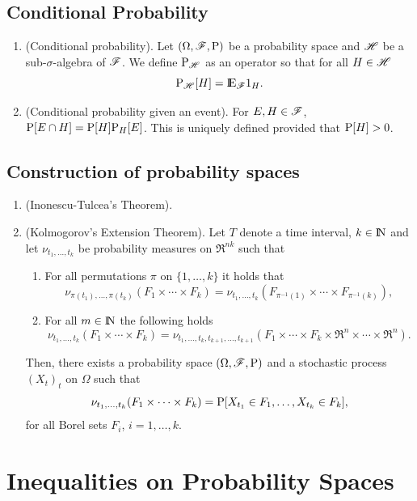\documentclass[a4paper,10pt]{scrbook}
\begin{document}
\subsection{Conditional Probability}
\begin{enumerate}
 \item (Conditional probability). Let $(\Omega,\mathscr{F},\mathrm{P})$ be a probability space and $\mathscr{H}$ be a sub-$\sigma$-algebra
       of $\mathscr{F}$. We define $\mathrm{P}_{\mathscr{H}}$ as an operator so that for all $H\in\mathscr{H}$
       \[
        \prob_{\HH}[H] = \E_{\F}1_{H}.
       \]
 \item (Conditional probability given an event). For $E,H\in\mathscr{F}$, $\mathrm{P}[E\cap H] = \mathrm{P}[H]\mathrm{P}_{H}[E]$. This is
       uniquely defined provided that $\mathrm{P}[H]>0$.
\end{enumerate}

\subsection{Construction of probability spaces}
\begin{enumerate}
 \item (Inonescu-Tulcea's Theorem). 
 \item (Kolmogorov's Extension Theorem). Let \(T\) denote a time interval, \(k\in\N\) and let 
       \(\nu_{t_1,\ldots, t_k}\) be probability measures on \(\Re^{nk}\) such that 
       \begin{enumerate}
        \item For all permutations \(\pi\) on \(\{1,\ldots, k\}\) it holds that 
        \[
	      \nu_{\pi(t_1),\ldots, \pi(t_k)}(F_1\times\cdots\times F_k)
	      {}={} 
	      \nu_{t_1,\ldots, t_k}(F_{\pi^{-1}(1)}\times \cdots \times F_{\pi^{-1}(k)}),
	\]
	\item For all \(m\in\N\) the following holds 
	\[
		\nu_{t_1,\ldots, t_k}(F_1\times\cdots\times F_k)
		=
		\nu_{t_1,\ldots, t_k,t_{k+1},\ldots, t_{k+1}}(F_1\times\cdots\times F_k\times \Re^n\times \cdots \times \Re^n).
	\]
       \end{enumerate}
      Then, there exists a probability space \((\Omega,\mathscr{F},\mathrm{P})\) and a stochastic process \((X_t)_t\) on \(\Omega\) such that 
      \[
       \nu_{t_1,\ldots, t_k}(F_1\times\cdots\times F_k) = \mathrm{P}[X_{t_1}\in F_1, \ldots, X_{t_k}\in F_k],
      \]
      for all Borel sets \(F_i\), \(i=1,\ldots, k\).
      

\end{enumerate}



\section{Inequalities on Probability Spaces}
\end{document}
